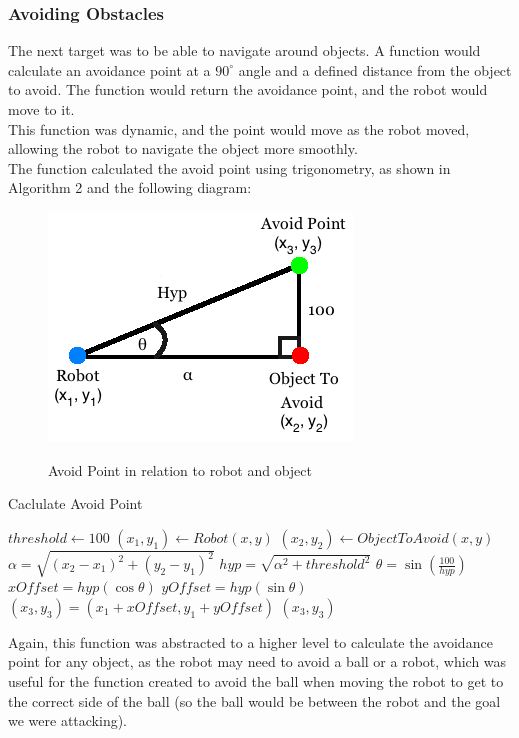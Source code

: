 \subsubsection{Avoiding Obstacles}
The next target was to be able to navigate around objects. A function would calculate an avoidance point at a $90^{\circ}$ angle and a defined distance from the object to avoid. The function would return the avoidance point, and the robot would move to it. \\
This function was dynamic, and the point would move as the robot moved, allowing the robot to navigate the object more smoothly.\\
The function calculated the avoid point using trigonometry, as shown in Algorithm 2 and the following diagram:
\begin{center}
\begin{figure}[htp]
\leavevmode
\includegraphics[scale=0.6]{images/AvoidPoints.png}
\label{fig:AvoidPointDiagram}
\caption{Avoid Point in relation to robot and object}
\end{figure}
\end{center}

\begin{algorithm}
\caption{Caclulate Avoid Point}
\label{avoidPoint}
\begin{algorithmic}[1]
\STATE $threshold \gets 100$
\STATE $(x_{1}, y_{1}) \gets Robot (x, y)$
\STATE $(x_{2}, y_{2}) \gets Object To Avoid (x, y)$
\STATE $\alpha = \sqrt{(x_{2} - x_{1})^{2} + (y_{2} - y_{1})^{2}}$
\STATE $hyp = \sqrt{\alpha^{2} + threshold^{2}}$
\STATE $\theta = \sin(\frac{100}{hyp})$
\STATE $xOffset = hyp(\cos\theta)$
\STATE $yOffset = hyp(\sin\theta)$
\STATE $(x_{3}, y_{3}) = (x_{1} + xOffset, y_{1} + yOffset)$
\RETURN $(x_{3}, y_{3})$
\end{algorithmic}
\end{algorithm}

Again, this function was abstracted to a higher level to calculate the avoidance point for any object, as the robot may need to avoid a ball or a robot, which was useful for the function created to avoid the ball when moving the robot to get to the correct side of the ball (so the ball would be between the robot and the goal we were attacking). \linebreak

